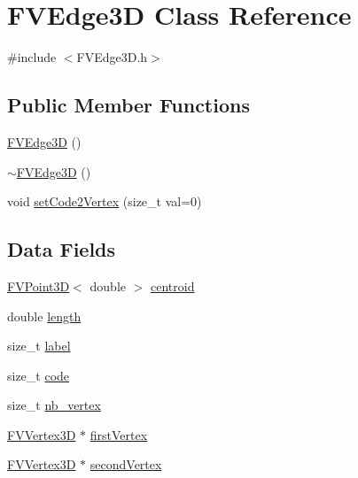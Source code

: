 \hypertarget{classFVEdge3D}{
\section{FVEdge3D Class Reference}
\label{d1/d9c/classFVEdge3D}
}


{\ttfamily \#include $<$FVEdge3D.h$>$}

\subsection*{Public Member Functions}
\begin{DoxyCompactItemize}
\item 
\hyperlink{classFVEdge3D_acb71686a9629206b1ad717ebd7a17007}{FVEdge3D} ()
\item 
\hyperlink{classFVEdge3D_a128e524b68413d4b3afa032062457e51}{$\sim$FVEdge3D} ()
\item 
void \hyperlink{classFVEdge3D_a0a47b3287cfccb79cba1552f3ad1e7b9}{setCode2Vertex} (size\_\-t val=0)
\end{DoxyCompactItemize}
\subsection*{Data Fields}
\begin{DoxyCompactItemize}
\item 
\hyperlink{classFVPoint3D}{FVPoint3D}$<$ double $>$ \hyperlink{classFVEdge3D_af0e77c00d990c1a712cf032be1bb8f0f}{centroid}
\item 
double \hyperlink{classFVEdge3D_a928b11f5716331f0b89abe7d8d4124b4}{length}
\item 
size\_\-t \hyperlink{classFVEdge3D_a1ec973463c76e6d9e91160720959ad68}{label}
\item 
size\_\-t \hyperlink{classFVEdge3D_acf258c3b3328a96e3ee1e3b875b7874f}{code}
\item 
size\_\-t \hyperlink{classFVEdge3D_a0a063e99fbc85e837d93dfbcda6f5252}{nb\_\-vertex}
\item 
\hyperlink{classFVVertex3D}{FVVertex3D} $\ast$ \hyperlink{classFVEdge3D_a80fbee0c4cd57248b91ca5b4c3ffa621}{firstVertex}
\item 
\hyperlink{classFVVertex3D}{FVVertex3D} $\ast$ \hyperlink{classFVEdge3D_a1022ea9cc9a93a6cea8eec59c092593a}{secondVertex}
\end{DoxyCompactItemize}


